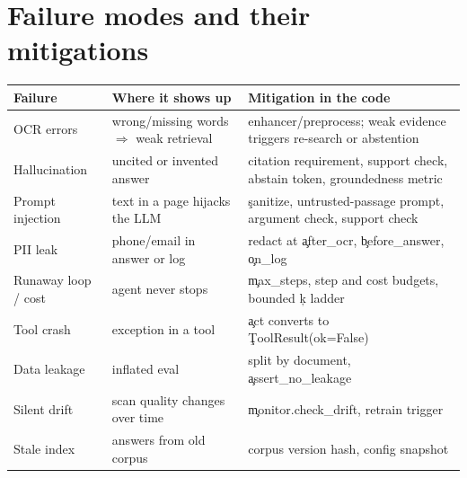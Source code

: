 \section{Failure modes and their mitigations}
\begin{longtable}{@{}p{3.6cm}p{4.2cm}p{6.7cm}@{}}\toprule Failure & Where it shows up & Mitigation in the code \\ \midrule \endhead
OCR errors & wrong/missing words $\Rightarrow$ weak retrieval & enhancer/preprocess; weak evidence triggers re-search or abstention \\
Hallucination & uncited or invented answer & citation requirement, support check, abstain token, groundedness metric \\
Prompt injection & text in a page hijacks the LLM & \c{sanitize}, untrusted-passage prompt, argument check, support check \\
PII leak & phone/email in answer or log & redact at \c{after\_ocr}, \c{before\_answer}, \c{on\_log} \\
Runaway loop / cost & agent never stops & \c{max\_steps}, step and cost budgets, bounded \c{k} ladder \\
Tool crash & exception in a tool & \c{act} converts to \c{ToolResult(ok=False)} \\
Data leakage & inflated eval & split by document, \c{assert\_no\_leakage} \\
Silent drift & scan quality changes over time & \c{monitor.check\_drift}, retrain trigger \\
Stale index & answers from old corpus & corpus version hash, config snapshot \\
\bottomrule\end{longtable}


